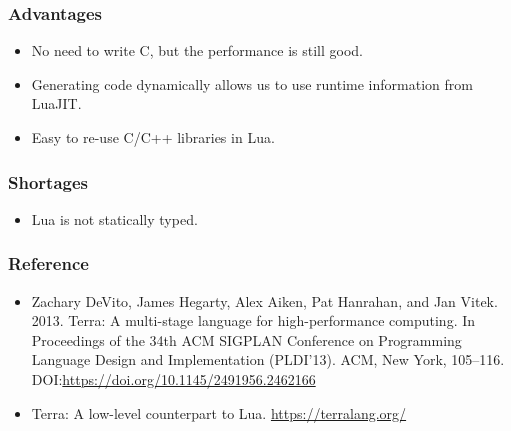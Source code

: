 \documentclass{beamer}
\begin{document}
\begin{frame}
	\frametitle{Advantages}
  \begin{itemize}
  \item No need to write C, but the performance is still good.\pause
  \item Generating code dynamically allows us to use runtime information from LuaJIT.\pause
  \item Easy to re-use C/C++ libraries in Lua.\pause
  \end{itemize}
\end{frame}

\begin{frame}
	\frametitle{Shortages}
  \begin{itemize}
  \item Lua is not statically typed.
  \end{itemize}
\end{frame}

\begin{frame}
	\frametitle{Reference}
  \begin{itemize}
  \item Zachary DeVito, James Hegarty, Alex Aiken, Pat Hanrahan, and Jan Vitek. 2013. Terra: A multi-stage language for high-performance computing. In Proceedings of the 34th ACM SIGPLAN Conference on Programming Language Design and Implementation (PLDI’13). ACM, New York, 105–116. DOI:\url{https://doi.org/10.1145/2491956.2462166}
  \item Terra: A low-level counterpart to Lua. \url{https://terralang.org/}
  \end{itemize}
\end{frame}
\end{document}

